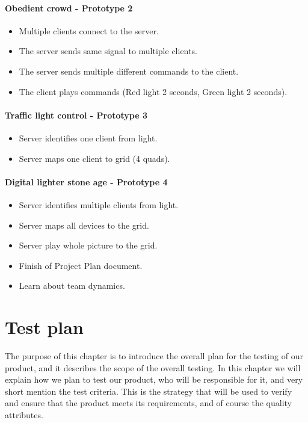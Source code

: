 \paragraph{Obedient crowd - Prototype 2}
\begin{itemize}
	\item Multiple clients connect to the server.
	\item The server sends same signal to multiple clients.
	\item The server sends multiple different commands to the client.
	\item The client plays commands (Red light 2 seconds, Green light 2 seconds).
\end{itemize}

\paragraph{Traffic light control - Prototype 3}
\begin{itemize}
	\item Server identifies one client from light.
	\item Server maps one client to grid (4 quads).
\end{itemize}

\paragraph{Digital lighter stone age - Prototype 4}
\begin{itemize}
	\item Server identifies multiple clients from light.
	\item Server maps all devices to the grid.
	\item Server play whole picture to the grid.
\end{itemize}


\begin{itemize}
	\item Finish of Project Plan document.
	\item Learn about team dynamics.
\end{itemize}

\section{Test plan}
The purpose of this chapter is to introduce the overall plan for the testing of our product, and it describes the scope of the overall testing.
In this chapter we will explain how we plan to test our product, who will be responsible for it, and very short mention the test criteria.
This is the strategy that will be used to verify and ensure that the product meets its requirements, and of course the quality attributes. 

